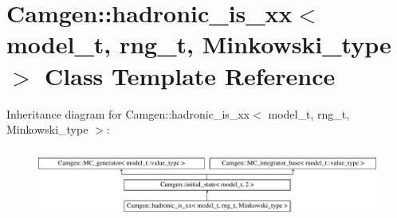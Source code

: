 \hypertarget{a00261}{}\section{Camgen\+:\+:hadronic\+\_\+is\+\_\+xx$<$ model\+\_\+t, rng\+\_\+t, Minkowski\+\_\+type $>$ Class Template Reference}
\label{a00261}
Inheritance diagram for Camgen\+:\+:hadronic\+\_\+is\+\_\+xx$<$ model\+\_\+t, rng\+\_\+t, Minkowski\+\_\+type $>$\+:\begin{figure}[H]
\begin{center}
\leavevmode
\includegraphics[height=2.333333cm]{a00261}
\end{center}
\end{figure}
